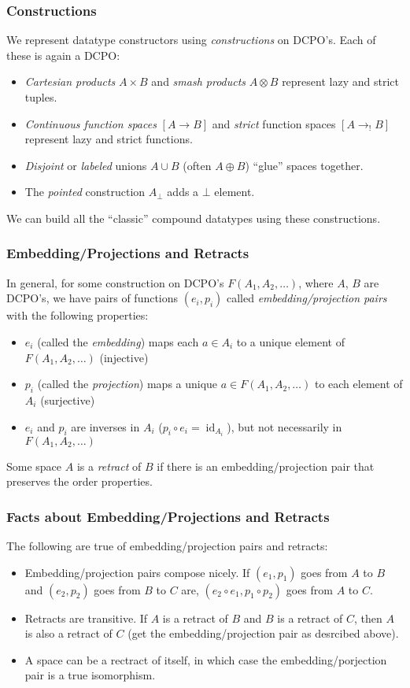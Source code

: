\documentclass{beamer}
\begin{document}
\begin{frame}
  \frametitle{Constructions}
  We represent datatype constructors using \emph{constructions} on
  DCPO's.  Each of these is again a DCPO:
  \begin{itemize}
    \item \emph{Cartesian products} $A\times B$ and \emph{smash
      products} $A\otimes B$ represent lazy and strict tuples.
    \item \emph{Continuous function spaces} $[A\rightarrow B]$ and
      \emph{strict} function spaces $[A\rightarrow_{!}B]$ represent
      lazy and strict functions.
    \item \emph{Disjoint} or \emph{labeled} unions $A \cup B$ (often
      $A \oplus B$) ``glue'' spaces together.
    \item The \emph{pointed} construction $A_{\bot}$ adds a $\bot$
      element.
  \end{itemize}
  We can build all the ``classic'' compound datatypes using these
  constructions.
\end{frame}

\begin{frame}
  \frametitle{Embedding/Projections and Retracts}

  In general, for some construction on DCPO's $F(A_1, A_2, \ldots)$,
  where $A$, $B$ are DCPO's, we have pairs of functions $(e_i, p_i)$
  called \emph{embedding/projection pairs} with the following
  properties:
  \begin{itemize}
    \item $e_i$ (called the \emph{embedding}) maps each $a\in A_i$ to
      a unique element of $F(A_1, A_2, \ldots)$ (injective)
    \item $p_i$ (called the \emph{projection}) maps a unique $a \in
      F(A_1, A_2, \ldots)$ to each element of $A_i$ (surjective)
    \item $e_i$ and $p_i$ are inverses in $A_i$ ($p_i\circ e_i =
      \operatorname{id}_{A_i}$), but not necessarily in $F(A_1, A_2,
      \ldots)$
  \end{itemize}
  Some space $A$ is a \emph{retract} of $B$ if there is an
  embedding/projection pair that preserves the order properties.
\end{frame}

\begin{frame}
  \frametitle{Facts about Embedding/Projections and Retracts}
  The following are true of embedding/projection pairs and retracts:
  \begin{itemize}
    \item Embedding/projection pairs compose nicely.  If $(e_1, p_1)$
      goes from $A$ to $B$ and $(e_2, p_2)$ goes from $B$ to $C$ are,
      $(e_2\circ e_1, p_1\circ p_2)$ goes from $A$ to $C$.
    \item Retracts are transitive.  If $A$ is a retract of $B$ and $B$
      is a retract of $C$, then $A$ is also a retract of $C$ (get the
      embedding/projection pair as desrcibed above).
    \item A space can be a rectract of itself, in which case the
      embedding/porjection pair is a true isomorphism.
  \end{itemize}
\end{frame}
\end{document}
